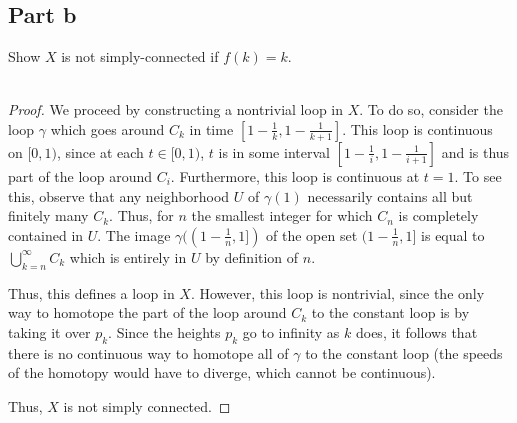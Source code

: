\documentclass[fontsize=11pt]{scrartcl} %
\numberwithin{equation}{section} %
\numberwithin{figure}{section} %
\numberwithin{table}{section} %
\begin{document}
\subsection*{Part b}
Show $X$ is not simply-connected if $f(k) = k$.
\\
\\
\begin{proof}
    We proceed by constructing a nontrivial loop in $X$. To do so, consider the
    loop $\gamma$ which goes around $C_k$ in time
    $[1-\frac{1}{k},1-\frac{1}{k+1}]$. This loop is continuous on $[0,1)$, since
    at each $t\in [0,1)$, $t$ is in some interval
    $[1-\frac{1}{i},1-\frac{1}{i+1}]$ and is thus part of the loop around $C_i$.
    Furthermore, this loop is continuous at $t=1$. To see this, observe that any
    neighborhood $U$ of $\gamma(1)$ necessarily contains all but finitely many
    $C_k$. Thus, for $n$ the smallest integer for which $C_n$ is completely
    contained in $U$. The image $\gamma((1-\frac{1}{n},1])$ of the open set
    $(1-\frac{1}{n},1]$ is equal to $\bigcup_{k=n}^{\infty}C_k$ which is
    entirely in $U$ by definition of $n$.

    Thus, this defines a loop in $X$. However, this loop is nontrivial, since
    the only way to homotope the part of the loop around $C_k$ to the constant
    loop is by taking it over $p_k$. Since the heights $p_k$ go to infinity as
    $k$ does, it follows that there is no continuous way to homotope all of
    $\gamma$ to the constant loop (the speeds of the homotopy would have to
    diverge, which cannot be continuous).

    Thus, $X$ is not simply connected.
\end{proof}
\end{document}
